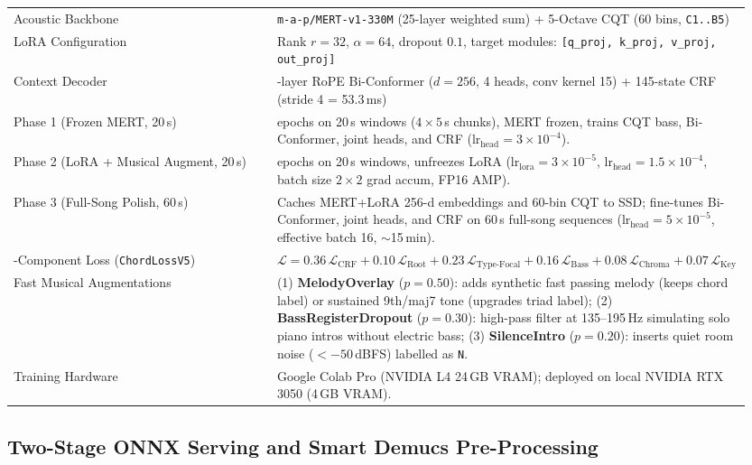 \documentclass[a4paper]{article}
\begin{document}
\begin{longtable}{@{}
    >{\raggedright\arraybackslash}p{0.34\linewidth}
    >{\raggedright\arraybackslash}p{0.61\linewidth}@{}}
    Acoustic Backbone & \texttt{m-a-p/MERT-v1-330M} (25-layer weighted sum) + 5-Octave CQT (60 bins, \texttt{C1..B5}) \\
    \addlinespace
    LoRA Configuration & Rank $r=32$, $\alpha=64$, dropout $0.1$, target modules: \texttt{[q\_proj, k\_proj, v\_proj, out\_proj]} \\
    \addlinespace
    Context Decoder & 4-layer RoPE Bi-Conformer ($d=256$, 4 heads, conv kernel 15) + 145-state CRF (stride 4 = 53.3\,ms) \\
    \addlinespace
    Phase 1 (Frozen MERT, 20\,s) & 15 epochs on 20\,s windows ($4 \times 5$\,s chunks), MERT frozen, trains CQT bass, Bi-Conformer, joint heads, and CRF ($\text{lr}_{\text{head}} = 3 \times 10^{-4}$). \\
    \addlinespace
    Phase 2 (LoRA + Musical Augment, 20\,s) & 20 epochs on 20\,s windows, unfreezes LoRA ($\text{lr}_{\text{lora}} = 3 \times 10^{-5}$, $\text{lr}_{\text{head}} = 1.5 \times 10^{-4}$, batch size $2 \times 2$ grad accum, FP16 AMP). \\
    \addlinespace
    Phase 3 (Full-Song Polish, 60\,s) & Caches MERT+LoRA 256-d embeddings and 60-bin CQT to SSD; fine-tunes Bi-Conformer, joint heads, and CRF on 60\,s full-song sequences ($\text{lr}_{\text{head}} = 5 \times 10^{-5}$, effective batch 16, $\sim$15\,min). \\
    \addlinespace
    6-Component Loss (\texttt{ChordLossV5}) & $\mathcal{L} = 0.36\,\mathcal{L}_{\text{CRF}} + 0.10\,\mathcal{L}_{\text{Root}} + 0.23\,\mathcal{L}_{\text{Type-Focal}} + 0.16\,\mathcal{L}_{\text{Bass}} + 0.08\,\mathcal{L}_{\text{Chroma}} + 0.07\,\mathcal{L}_{\text{Key}}$ \\
    \addlinespace
    Fast Musical Augmentations & (1) \textbf{MelodyOverlay} ($p=0.50$): adds synthetic fast passing melody (keeps chord label) or sustained 9th/maj7 tone (upgrades triad label); (2) \textbf{BassRegisterDropout} ($p=0.30$): high-pass filter at 135--195\,Hz simulating solo piano intros without electric bass; (3) \textbf{SilenceIntro} ($p=0.20$): inserts quiet room noise ($<-50$\,dBFS) labelled as \texttt{N}. \\
    \addlinespace
    Training Hardware & Google Colab Pro (NVIDIA L4 24\,GB VRAM); deployed on local NVIDIA RTX 3050 (4\,GB VRAM). \\
\end{longtable}

\subsection{Two-Stage ONNX Serving and Smart Demucs Pre-Processing}
\end{document}
